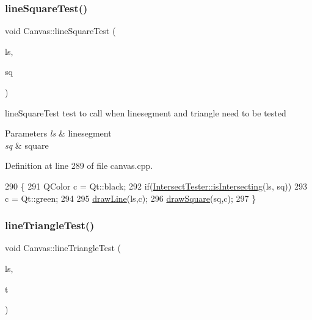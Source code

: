 \subsubsection{\texorpdfstring{line\+Square\+Test()}{lineSquareTest()}}
{\footnotesize\ttfamily void Canvas\+::line\+Square\+Test (\begin{DoxyParamCaption}\item[{\hyperlink{class_line_segment}{Line\+Segment}}]{ls,  }\item[{\hyperlink{class_a_a_b_b}{A\+A\+BB}}]{sq }\end{DoxyParamCaption})\hspace{0.3cm}{\ttfamily [private]}}



line\+Square\+Test test to call when linesegment and triangle need to be tested 


\begin{DoxyParams}{Parameters}
{\em ls} & linesegment \\
\hline
{\em sq} & square \\
\hline
\end{DoxyParams}


Definition at line 289 of file canvas.\+cpp.


\begin{DoxyCode}
290 \{
291     QColor c = Qt::black;
292     \textcolor{keywordflow}{if}(\hyperlink{class_intersect_tester_a7710e17ff7d2e229059f23b9429213f5}{IntersectTester::isIntersecting}(ls, sq))
293         c = Qt::green;
294 
295     \hyperlink{class_canvas_ae3ad5d92c9a2868b94a6570914b05366}{drawLine}(ls,c);
296     \hyperlink{class_canvas_a78ce810ea0004c4f3fa9ee9d92996875}{drawSquare}(sq,c);
297 \}
\end{DoxyCode}
\mbox{\label{class_canvas_a39de2e31ab9a27b918fc4f7e78ee2030}} 
\subsubsection{\texorpdfstring{line\+Triangle\+Test()}{lineTriangleTest()}}
{\footnotesize\ttfamily void Canvas\+::line\+Triangle\+Test (\begin{DoxyParamCaption}\item[{\hyperlink{class_line_segment}{Line\+Segment}}]{ls,  }\item[{\hyperlink{class_triangle}{Triangle}}]{t }\end{DoxyParamCaption})\hspace{0.3cm}{\ttfamily [private]}}



